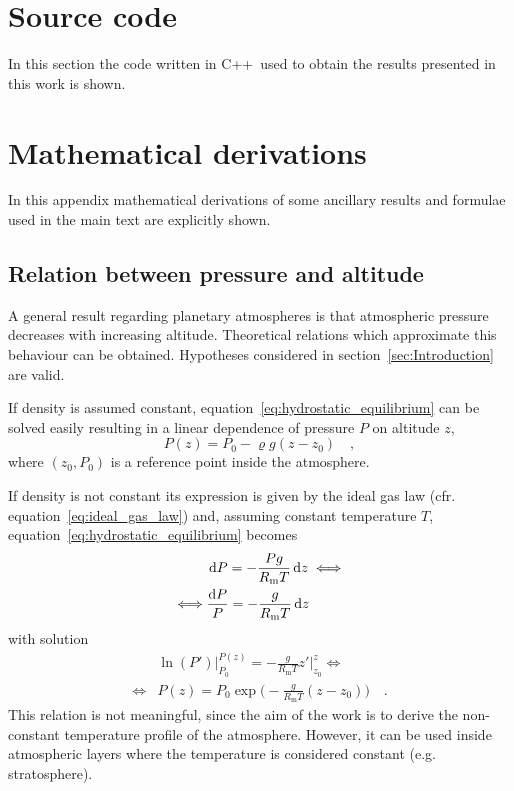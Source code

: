 \documentclass[a4paper,10pt,twocolumn,\classoptions]{article}
\newcommand{\cpp}{C++}
\begin{document}
\newpage
\appendix

\onecolumn
\section{Source code}
In this section the code written in \cpp\ used to obtain the results presented in this work is shown.




\twocolumn
\section{Mathematical derivations}
In this appendix mathematical derivations of some ancillary results and formulae used in the main text are explicitly shown.



\subsection{Relation between pressure and altitude}
\label{sec:Relation between pressure and altitude}
A general result regarding planetary atmospheres is that atmospheric pressure decreases with increasing altitude. Theoretical relations which approximate this behaviour can be obtained. Hypotheses considered in section~\ref{sec:Introduction} are valid.

If density is assumed constant, equation~\eqref{eq:hydrostatic_equilibrium} can be solved easily resulting in a linear dependence of pressure $P$ on altitude $z$,
\begin{equation}
  \label{eq:pressure_constant_density}
  P(z) = P_0 - \varrho g (z - z_0)
  \quad ,
\end{equation}
where $(z_0, P_0)$ is a reference point inside the atmosphere.

If density is not constant its expression is given by the ideal gas law (cfr. equation~\eqref{eq:ideal_gas_law}) and, assuming constant temperature $T$, equation~\eqref{eq:hydrostatic_equilibrium} becomes
\begin{equation}
  \label{eq:hydrostatic_equilibrium_ideal_gas_law_constant_temperature}
  \begin{split}
    & \odif{P} = - \frac{P g}{R_\text{m} T} \odif{z} \iff \\
    \iff & \frac{\odif{P}}{P} = - \frac{g}{R_\text{m} T} \odif{z}
  \end{split}
\end{equation}
with solution
\begin{equation}
  \label{eq:pressure_constant_temperature}
  \begin{split}
    & \ln(P') \bigg|_{P_0}^{P(z)} = - \frac{g}{R_\text{m} T} z' \bigg|_{z_0}^{z} \iff \\
    \iff & P(z) = P_0 \exp{\bigg( - \frac{g}{R_\text{m} T} (z - z_0) \bigg)}
    \quad .
  \end{split}
\end{equation}
This relation is not meaningful, since the aim of the work is to derive the non-constant temperature profile of the atmosphere. However, it can be used inside atmospheric layers where the temperature is considered constant (e.g. stratosphere).
\end{document}

